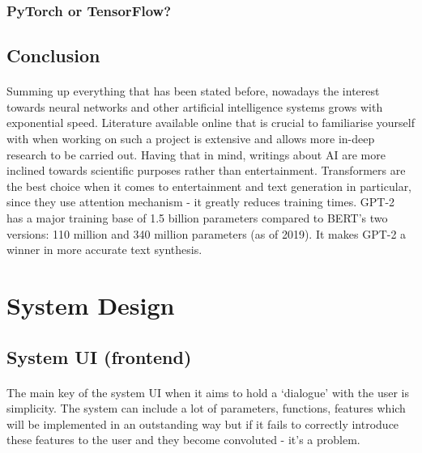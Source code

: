 \documentclass[12pt]{report}
\begin{document}
    \subsubsection*{PyTorch or TensorFlow?}
    \paragraph{}

    \subsection*{Conclusion}
    \paragraph{}

    Summing up everything that has been stated before, nowadays the interest towards neural networks and other artificial intelligence systems grows with exponential speed. Literature available online that is crucial to familiarise yourself with when working on such a project is extensive and allows more in-deep research to be carried out. Having that in mind, writings about AI are more inclined towards scientific purposes rather than entertainment.
    Transformers are the best choice when it comes to entertainment and text generation in particular, since they use attention mechanism - it greatly reduces training times. GPT-2 has a major training base of 1.5 billion parameters compared to BERT's two versions: 110 million and 340 million parameters (as of 2019). It makes GPT-2 a winner in more accurate text synthesis.

    
    \section*{System Design}

    \subsection*{System UI (frontend)}
    \paragraph{}

    The main key of the system UI when it aims to hold a `dialogue' with the user is simplicity. The system can include a lot of parameters, functions, features which will be implemented in an outstanding way but if it fails to correctly introduce these features to the user and they become convoluted - it's a problem.
    
\end{document}
